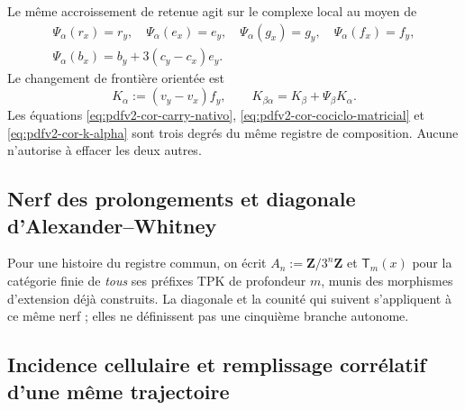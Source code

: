 Le même accroissement de retenue agit sur le complexe local au moyen de
\begin{equation}
\label{eq:pdfv2-cor-psi-generadores}
 \begin{gathered}
 \Psi_\alpha(r_x)=r_y,\quad
 \Psi_\alpha(e_x)=e_y,\quad
 \Psi_\alpha(g_x)=g_y,\quad
 \Psi_\alpha(f_x)=f_y,\\
 \Psi_\alpha(b_x)=b_y+3(c_y-c_x)e_y.
 \end{gathered}
\end{equation}
Le changement de frontière orientée est
\begin{equation}
\label{eq:pdfv2-cor-k-alpha}
 K_\alpha:=(v_y-v_x)f_y,
 \qquad
 K_{\beta\alpha}=K_\beta+\Psi_\beta K_\alpha.
\end{equation}
Les équations \eqref{eq:pdfv2-cor-carry-nativo}, \eqref{eq:pdfv2-cor-cociclo-matricial} et \eqref{eq:pdfv2-cor-k-alpha} sont trois degrés du même registre de composition. Aucune n'autorise à effacer les deux autres.

\subsection{Nerf des prolongements et diagonale d'Alexander--Whitney}
Pour une histoire du registre commun, on écrit \(A_n:=\mathbf Z/3^n\mathbf Z\) et \(\mathsf T_m(x)\) pour la catégorie finie de \emph{tous} ses préfixes TPK de profondeur \(m\), munis des morphismes d'extension déjà construits. La diagonale et la counité qui suivent s'appliquent à ce même nerf ; elles ne définissent pas une cinquième branche autonome.
\begingroup
\let\section\subsection

\endgroup

\section{Incidence cellulaire et remplissage corrélatif d'une même trajectoire}

